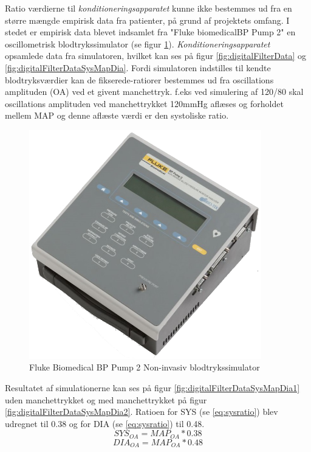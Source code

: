 \begin{minipage}[c]{0.5\textwidth}
	Ratio værdierne til \textit{konditioneringsapparatet} kunne ikke bestemmes ud fra en større mængde empirisk data fra patienter, på grund af projektets omfang. I stedet er empirisk data blevet indsamlet fra "Fluke biomedicalBP Pump 2" en oscillometrisk blodtrykssimulator (se figur \ref{fig:TheFlukeBiomedicalBPPump2L}). \textit{Konditioneringsapparatet} opsamlede data fra simulatoren, hvilket kan ses på figur \ref{fig:digitalFilterData} og \ref{fig:digitalFilterDataSysMapDia}. Fordi simulatoren indstilles til kendte blodtryksværdier kan de fikserede-ratiorer bestemmes ud fra oscillations amplituden (OA) ved et givent manchettryk. f.eks ved simulering af 120/80 skal oscillations amplituden ved manchettrykket 120mmHg aflæses og forholdet mellem MAP og denne aflæste værdi er den systoliske ratio.
	
	
\end{minipage}
\begin{minipage}[c]{0.5\textwidth}
	\begin{figure}[H]
		\centering
		\includegraphics[trim={0 0 0 0},clip, width=0.9\textwidth]{billeder/TheFlukeBiomedicalBPPump2L.png}	
		\parbox{7cm}{\caption{Fluke Biomedical BP Pump 2 Non-invasiv blodtrykssimulator}\label{fig:TheFlukeBiomedicalBPPump2L}}
	\end{figure}
\end{minipage}

Resultatet af simulationerne kan ses på figur \ref{fig:digitalFilterDataSysMapDia1} uden manchettrykket og med manchettrykket på figur \ref{fig:digitalFilterDataSysMapDia2}. Ratioen for SYS (se \ref{eq:sysratio}) blev udregnet til 0.38 og for DIA (se \ref{eq:sysratio}) til 0.48. 
	\begin{equation}
	SYS_{OA}=MAP_{OA}*0.38
	\label{eq:sysratio}
	\end{equation}
	\begin{equation}
	DIA_{OA}=MAP_{OA}*0.48
	\label{eq:diaratio}
	\end{equation}

